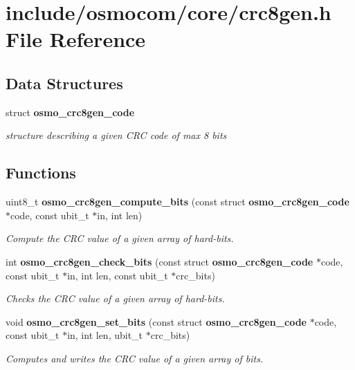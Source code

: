 \section{include/osmocom/core/crc8gen.h File Reference}
\label{crc8gen_8h}
\subsection*{Data Structures}
\begin{DoxyCompactItemize}
\item 
struct \textbf{ osmo\+\_\+crc8gen\+\_\+code}
\begin{DoxyCompactList}\small\item\em structure describing a given C\+RC code of max 8 bits \end{DoxyCompactList}\end{DoxyCompactItemize}
\subsection*{Functions}
\begin{DoxyCompactItemize}
\item 
uint8\+\_\+t \textbf{ osmo\+\_\+crc8gen\+\_\+compute\+\_\+bits} (const struct \textbf{ osmo\+\_\+crc8gen\+\_\+code} $\ast$code, const ubit\+\_\+t $\ast$in, int len)
\begin{DoxyCompactList}\small\item\em Compute the C\+RC value of a given array of hard-\/bits. \end{DoxyCompactList}\item 
int \textbf{ osmo\+\_\+crc8gen\+\_\+check\+\_\+bits} (const struct \textbf{ osmo\+\_\+crc8gen\+\_\+code} $\ast$code, const ubit\+\_\+t $\ast$in, int len, const ubit\+\_\+t $\ast$crc\+\_\+bits)
\begin{DoxyCompactList}\small\item\em Checks the C\+RC value of a given array of hard-\/bits. \end{DoxyCompactList}\item 
void \textbf{ osmo\+\_\+crc8gen\+\_\+set\+\_\+bits} (const struct \textbf{ osmo\+\_\+crc8gen\+\_\+code} $\ast$code, const ubit\+\_\+t $\ast$in, int len, ubit\+\_\+t $\ast$crc\+\_\+bits)
\begin{DoxyCompactList}\small\item\em Computes and writes the C\+RC value of a given array of bits. \end{DoxyCompactList}\end{DoxyCompactItemize}
